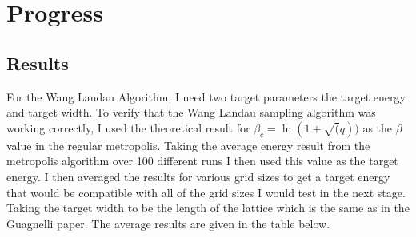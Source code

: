 \documentclass[10pt,a4paper]{article}
\begin{document}


\section{Progress}



\subsection{Results}
For the Wang Landau Algorithm, I need two target parameters the target energy and target width.
To verify that the Wang Landau sampling algorithm was working correctly, I used the theoretical result for $\beta_c = \ln(1+\sqrt(q))$ as the $\beta$ value in the regular metropolis.
Taking the average energy result from the metropolis algorithm over 100 different runs I then used this value as the target energy.
I then averaged the results for various grid sizes to get a target energy that would be compatible with all of the grid sizes I would test in the next stage.
Taking the target width to be the length of the lattice which is the same as in the Guagnelli paper\cite{guagnelli}.
The average results are given in the table below.
\end{document}
